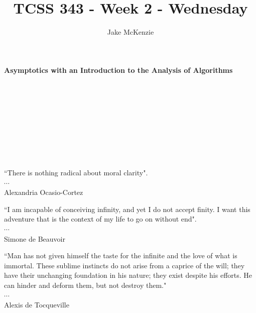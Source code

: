 \documentclass[12pt]{article}
\begin{document}
\title{TCSS 343 - Week 2 - Wednesday}
\author{Jake McKenzie}
\maketitle
\noindent\centerline{\textbf{Asymptotics with an Introduction to the Analysis of Algorithms}}\\\\\\\\\\\\\\\\
\begin{center}
    ``There is nothing radical about moral clarity". \\$\cdots$\\ Alexandria Ocasio-Cortez
\end{center}
\begin{center}
    ``I am incapable of conceiving infinity, and yet I do not accept finity. I want this adventure that is the context of my life to go on without end". \\$\cdots$\\ Simone de Beauvoir
\end{center}
\begin{center}
    ``Man has not given himself the taste for the infinite and the love of what is immortal. These sublime instincts do not arise from a caprice of the will; they have their unchanging foundation in his nature; they exist despite his efforts. He can hinder and deform them, but not destroy them."\\
    $\cdots$\\
    Alexis de Tocqueville
\end{center}
\newpage
\end{document}
